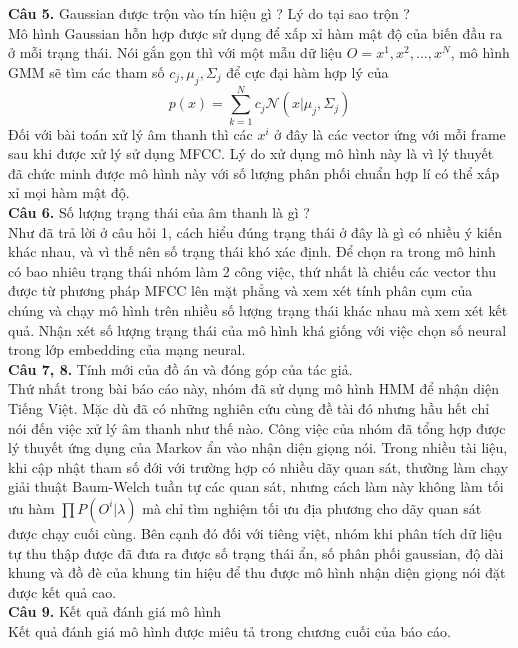 \documentclass[13pt]{extreport}
\begin{document}
\textbf{Câu 5.} Gaussian được trộn vào tín hiệu gì ? Lý do tại sao trộn ? \\
Mô hình Gaussian hỗn hợp được sử dụng để xấp xỉ hàm mật độ của biến đầu ra ở mỗi trạng thái. Nói gắn gọn thì với một mẫu dữ liệu $O = {x^1, x^2, ..., x^N}$, mô hình GMM sẽ tìm các tham số $c_j, \mu_j, \Sigma_j$ để cực đại hàm hợp lý của
$$ p(x) = \sum_{k = 1}^N c_j \mathcal{N}(x | \mu_j, \Sigma_j)$$
Đối với bài toán xử lý âm thanh thì các $x^i$ ở đây là các vector ứng với mỗi frame sau khi được xử lý sử dụng MFCC. Lý do xử dụng mô hình này là vì lý thuyết đã chức minh được mô hình này với số lượng phân phối chuẩn hợp lí có thể xấp xỉ mọi hàm mật độ. \\

\textbf{Câu 6.} Số lượng trạng thái của âm thanh là gì ? \\
Như đã trả lời ở câu hỏi 1, cách hiểu đúng trạng thái ở đây là gì có nhiều ý kiến khác nhau, và vì thế nên số trạng thái khó xác định. Để chọn ra trong mô hinh có bao nhiêu trạng thái nhóm làm 2 công việc, thứ nhất là chiếu các vector thu được từ phương pháp MFCC lên mặt phẳng và xem xét tính phân cụm của chúng và chạy mô hình trên nhiều số lượng trạng thái khác nhau mà xem xét kết quả. Nhận xét số lượng trạng thái của mô hình khá giống với việc chọn số neural trong lớp embedding của mạng neural. \\

\textbf{Câu 7, 8.} Tính mới của đồ án và đóng góp của tác giả. \\
Thứ nhất trong bài báo cáo này, nhóm đã sử dụng mô hình HMM để nhận diện Tiếng Việt. Mặc dù đã có những nghiên cứu cùng đề tài đó nhưng hầu hết chỉ nói đến việc xử lý âm thanh như thế nào. Công việc của nhóm đã tổng hợp được lý thuyết ứng dụng của Markov ẩn vào nhận diện giọng nói. Trong nhiều tài liệu, khi cập nhật tham số đới với trường hợp có nhiều dãy quan sát, thường làm chạy giải thuật Baum-Welch tuần tự các quan sát, nhưng cách làm này không làm tối ưu hàm $\prod P(O^i | \lambda) $ mà chỉ tìm nghiệm tối ưu địa phương cho dãy quan sát được chạy cuối cùng. Bên cạnh đó đối với tiêng việt,  nhóm khi phân tích dữ liệu tự thu thập được đã đưa ra được số trạng thái ẩn, số phân phối gaussian, độ dài khung và đồ đè của khung tin hiệu để thu được mô hình nhận diện giọng nói đặt được kết quả cao. \\

\textbf{Câu 9.} Kết quả đánh giá mô hình \\
Kết quả đánh giá mô hình được miêu tả trong chương cuối của báo cáo. \\
\end{document}
